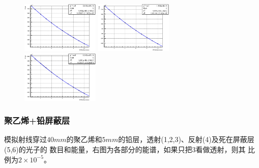 \documentclass{beamer}
\newcommand{\liuhao}{\fontsize{7.875pt}{\baselineskip}\selectfont}
\begin{document}
\begin{CJK*}{UTF8}{gkai}
\begin{frame}
\begin{figure}[ht]
      \includegraphics[width=0.33\textwidth]{matPb1500kevGammaMu.eps}
      \includegraphics[width=0.33\textwidth]{matPb2MevGammaMu.eps}
      \includegraphics[width=0.33\textwidth]{matPb10MevGammaMu.eps}
    \end{figure}
  \end{frame}
  \begin{frame}\frametitle{聚乙烯+铅屏蔽层}
    \begin{minipage}[t]{0.25\textwidth}
      \liuhao
      模拟射线穿过$40mm$的聚乙烯和$5mm$的铅层，透射(1,2,3)、反射(4)及死在屏蔽层(5,6)的光子的
      数目和能量，右图为各部分的能谱，如果只把3看做透射，则其
      比例为$2\times 10^{-5}$。


\end{minipage}
\end{frame}
\end{CJK*}
\end{document}
